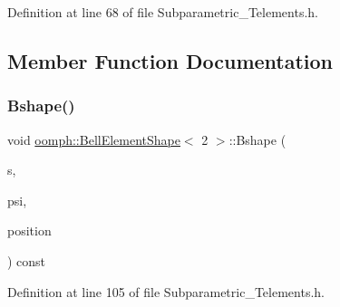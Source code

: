 Definition at line 68 of file Subparametric\+\_\+\+Telements.\+h.



\subsection{Member Function Documentation}
\mbox{\label{classoomph_1_1BellElementShape_3_012_01_4_a9bdd842366843435658f1f4dea5b8121}} 
\subsubsection{\texorpdfstring{Bshape()}{Bshape()}}
{\footnotesize\ttfamily void \hyperlink{classoomph_1_1BellElementShape}{oomph\+::\+Bell\+Element\+Shape}$<$ 2 $>$\+::Bshape (\begin{DoxyParamCaption}\item[{const \hyperlink{classoomph_1_1Vector}{Vector}$<$ double $>$ \&}]{s,  }\item[{\hyperlink{classoomph_1_1Shape}{Shape} \&}]{psi,  }\item[{\hyperlink{classoomph_1_1DenseMatrix}{Dense\+Matrix}$<$ double $>$ \&}]{position }\end{DoxyParamCaption}) const\hspace{0.3cm}{\ttfamily [inline]}}



Definition at line 105 of file Subparametric\+\_\+\+Telements.\+h.

\mbox{\label{classoomph_1_1BellElementShape_3_012_01_4_a691a47683df33de15960e804474fc03e}} 
